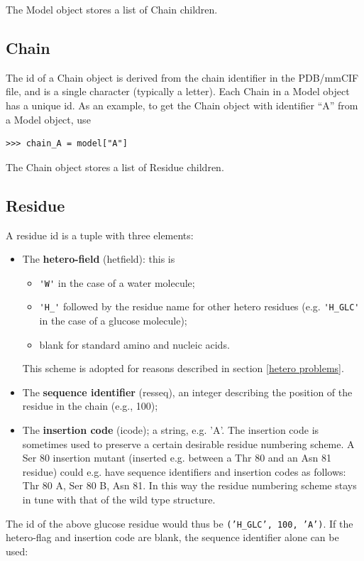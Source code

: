 \documentclass{report}
\begin{document}
The Model object stores a list of Chain children.

\subsection{Chain}

The id of a Chain object is derived from the chain identifier in the PDB/mmCIF
file, and is a single character (typically a letter). Each Chain in a Model object has a unique id. As an example, to get the Chain object with identifier ``A'' from a Model object, use
\begin{verbatim}
>>> chain_A = model["A"]
\end{verbatim}

The Chain object stores a list of Residue children.

\subsection{Residue}

A residue id is a tuple with three elements:

\begin{itemize}
\item The \textbf{hetero-field} (hetfield): this is
    \begin{itemize}
    \item \verb+'W'+ in the case of a water molecule;
    \item \verb+'H_'+ followed by the residue name for other hetero residues (e.g. \verb+'H_GLC'+ in the case of a glucose molecule);
    \item blank for standard amino and nucleic acids.
    \end{itemize}
This scheme is adopted for reasons described in section \ref{hetero problems}.
\item The \textbf{sequence identifier} (resseq), an integer describing the position of the residue in the chain (e.g., 100);
\item The \textbf{insertion code} (icode); a string, e.g. 'A'. The insertion code is sometimes used to preserve a certain desirable residue numbering scheme. A Ser 80 insertion mutant (inserted e.g. between a Thr 80 and an Asn 81
residue) could e.g. have sequence identifiers and insertion codes
as follows: Thr 80 A, Ser 80 B, Asn 81. In this way the residue numbering
scheme stays in tune with that of the wild type structure.
\end{itemize}
The id of the above glucose residue would thus be \texttt{('H\_GLC',
100, 'A')}. If the hetero-flag and insertion code are blank, the sequence
identifier alone can be used:
\end{document}
